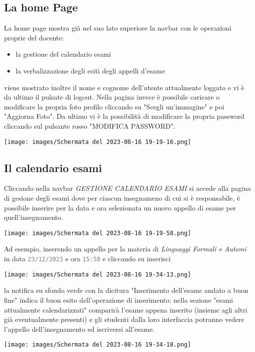 \documentclass{article}
\newcommand{\attr}[1]{\texttt{\textcolor{gray}{#1}}}
\begin{document}
    \subsection{La home Page}
    La home page mostra già nel suo lato superiore la navbar con le operazioni proprie del docente:
    \begin{itemize}
        \item la gestione del calendario esami
        \item la verbalizzazione degli esiti degli appelli d'esame
    \end{itemize}
    viene mostrato inoltre il nome e cognome dell'utente attualmente loggato e vi è da ultimo il pulsate di logout.
    Nella pagina invece è possibile caricare o modificare la propria foto profilo cliccando su "Scegli un'immagine" e poi "Aggiorna Foto".
    Da ultimo vi è la possibilità di modificare la propria password cliccando sul pulsante rosso "MODIFICA PASSWORD".

    \texttt{[image: images/Schermata del 2023-08-16 19-19-16.png]}

    \subsection{Il calendario esami}
    Cliccando nella navbar \textit{GESTIONE CALENDARIO ESAMI} si accede alla pagina di gesione degli esami dove per ciascun insegnameno di cui si è responsabile, è possibile inserire per la data e ora selezionata un nuovo appello di esame per quell'insegnamento.

    \texttt{[image: images/Schermata del 2023-08-16 19-19-58.png]}

    Ad esempio, inserendo un appello per la materia di \textit{Linguaggi Formali e Automi} in data \attr{23/12/2023} e ora \attr{15:50} e cliccando su inserisci

    \texttt{[image: images/Schermata del 2023-08-16 19-34-13.png]}

    la notifica su sfondo verde con la dicitura "Inserimento dell'esame andato a buon fine" indica il buon esito dell'operazione di inserimento: nella sezione "esami attualmente calendarizzati" comparirà l'esame appena inserito (insieme agli altri già eventualmente presenti) e gli studenti dalla loro interfaccia potranno vedere l'appello dell'insegnamento ed iscriversi all'esame.

    \texttt{[image: images/Schermata del 2023-08-16 19-34-18.png]}
\end{document}
